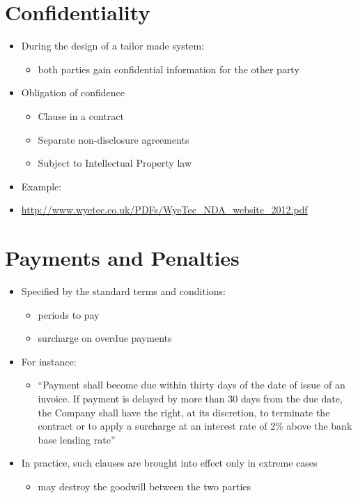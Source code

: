 \documentclass{article}
\begin{document}
\section{Confidentiality}
\begin{itemize}
\item During the design of a tailor made system:
\begin{itemize}
\item both parties gain confidential information for the other party
\end{itemize}
\item Obligation of confidence
\begin{itemize}
\item Clause in a contract
\item Separate non-disclosure agreements
\item Subject to Intellectual Property law
\end{itemize}
\item Example:
\item \url{http://www.wyetec.co.uk/PDFs/WyeTec_NDA_website_2012.pdf}
\end{itemize}



\section{Payments and Penalties}
\begin{itemize}
\item Specified by the standard terms and conditions:
\begin{itemize}
\item periods to pay
\item surcharge on overdue payments
\end{itemize}
\item For instance:
\begin{itemize}
\item ``Payment shall become due within thirty days of the date of issue of an invoice. If payment is delayed by more than 30 days from the due date, the Company shall have the right, at its discretion, to terminate the contract or to apply a surcharge at an interest rate of 2\% above the bank base lending rate''
\end{itemize}
\item In practice, such clauses are brought into effect only in extreme cases
\begin{itemize}
\item may destroy the goodwill between the two parties
\end{itemize}
\end{itemize}
\end{document}
